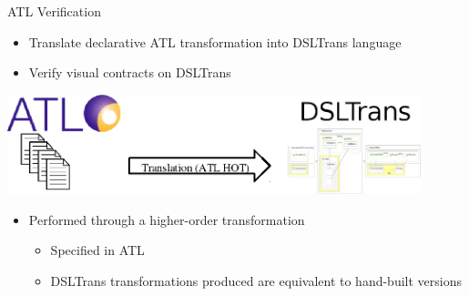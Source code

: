 \documentclass[12pt, handout]{beamer}
\begin{document}
\begin{frame}{ATL Verification}

\begin{itemize}[<+->]
\item Translate declarative ATL transformation into DSLTrans language
\item Verify visual contracts on DSLTrans
\end{itemize}
\begin{center}
\includegraphics[width=0.9\textwidth]{figures/overview}
\end{center}
\begin{itemize}[<+->]
\item Performed through a higher-order transformation
\begin{itemize}
\item Specified in ATL
\item DSLTrans transformations produced are equivalent to hand-built versions
\end{itemize}
\end{itemize}
\end{frame}
\end{document}
